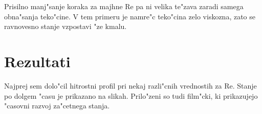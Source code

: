 \documentclass[a4paper,10pt]{article}
\begin{document}
Prisilno manj"sanje koraka za majhne Re pa ni velika te"zava zaradi samega obna"sanja teko"cine. V tem primeru je namre"c teko"cina zelo viskozna, zato se ravnovesno stanje vzpostavi "ze kmalu. 

\section{Rezultati}

Najprej sem dolo"cil hitrostni profil pri nekaj razli"cnih vrednostih za Re. Stanje po dolgem "casu je prikazano na slikah. Prilo"zeni so tudi film"cki, ki prikazujejo "casovni razvoj za"cetnega stanja. 
\end{document}
